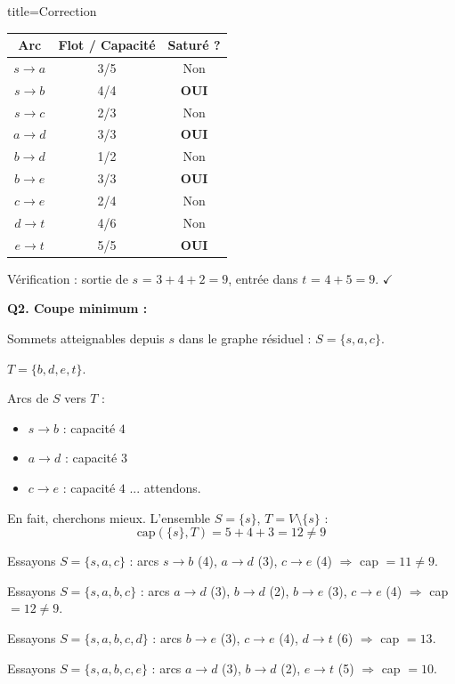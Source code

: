 \documentclass[12pt,a4paper]{article}
\begin{document}
\begin{correction}{title=Correction}
\begin{center}
\begin{tabular}{|c|c|c|}
\hline
\textbf{Arc} & \textbf{Flot / Capacit\'e} & \textbf{Satur\'e ?} \\\hline
$s \to a$ & 3/5 & Non \\\hline
$s \to b$ & 4/4 & \textbf{OUI} \\\hline
$s \to c$ & 2/3 & Non \\\hline
$a \to d$ & 3/3 & \textbf{OUI} \\\hline
$b \to d$ & 1/2 & Non \\\hline
$b \to e$ & 3/3 & \textbf{OUI} \\\hline
$c \to e$ & 2/4 & Non \\\hline
$d \to t$ & 4/6 & Non \\\hline
$e \to t$ & 5/5 & \textbf{OUI} \\\hline
\end{tabular}
\end{center}

V\'erification : sortie de $s$ = $3+4+2 = 9$, entr\'ee dans $t$ = $4+5 = 9$. $\checkmark$

\medskip
\textbf{Q2. Coupe minimum :}

Sommets atteignables depuis $s$ dans le graphe r\'esiduel : $S = \{s, a, c\}$.

$T = \{b, d, e, t\}$.

Arcs de $S$ vers $T$ :
\begin{itemize}[nosep]
    \item $s \to b$ : capacit\'e $4$
    \item $a \to d$ : capacit\'e $3$
    \item $c \to e$ : capacit\'e $4$ \quad ... attendons.
\end{itemize}

En fait, cherchons mieux. L'ensemble $S = \{s\}$, $T = V \setminus \{s\}$ :
$$\text{cap}(\{s\}, T) = 5 + 4 + 3 = 12 \neq 9$$

Essayons $S = \{s, a, c\}$ : arcs $s \to b$ (4), $a \to d$ (3), $c \to e$ (4) $\Rightarrow$ cap $= 11 \neq 9$.

Essayons $S = \{s, a, b, c\}$ : arcs $a \to d$ (3), $b \to d$ (2), $b \to e$ (3), $c \to e$ (4) $\Rightarrow$ cap $= 12 \neq 9$.

Essayons $S = \{s, a, b, c, d\}$ : arcs $b \to e$ (3), $c \to e$ (4), $d \to t$ (6) $\Rightarrow$ cap $= 13$.

Essayons $S = \{s, a, b, c, e\}$ : arcs $a \to d$ (3), $b \to d$ (2), $e \to t$ (5) $\Rightarrow$ cap $= 10$.


\end{correction}
\end{document}
